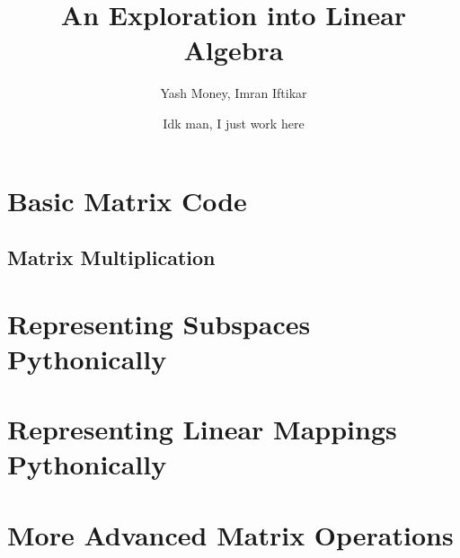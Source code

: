 \documentclass[12pt, a4paper]{article}
\title{An Exploration into Linear Algebra}
\author{Yash Money, Imran Iftikar}
\date{Idk man, I just work here}
\begin{document}
\maketitle


\section{Basic Matrix Code}

\subsection{Matrix Multiplication}

\section{Representing Subspaces Pythonically}

\section{Representing Linear Mappings Pythonically}

\section{More Advanced Matrix Operations}
\end{document}
